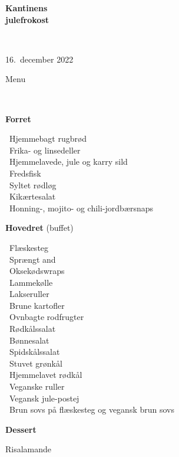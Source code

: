 \begin{center}
\begin{HUGE}
\textbf{Kantinens \\[3mm] julefrokost}
\end{HUGE}
\\[.6cm]
\begin{Large}
16.~december 2022
\end{Large}
\end{center}
\vspace*{.01cm}
\begin{center}
\begin{huge}
Menu
\end{huge}
\\[.1cm]
\end{center}
\newcommand{\course}[1]{\vspace*{4mm} \textbf{#1} \vspace{-7mm}}
\newcommand{\goodindent}{\null\hspace{23mm}}
{\small
\vspace{-0.5cm}
\begin{center}
\course{Forret}
\end{center}
  \goodindent~Hjemmebagt rugbrød
\\\goodindent~Frika- og linsedeller
\\\goodindent~Hjemmelavede, jule og karry sild
\\\goodindent~Fredsfisk
\\\goodindent~Syltet rødløg
\\\goodindent~Kikærtesalat
\\\goodindent~Honning-, mojito- og chili-jordbærsnaps

\begin{center}
\vspace{-0.2cm}
\course{Hovedret} (buffet)
\end{center}
  \goodindent~Flæskesteg
\\\goodindent~Sprængt and
\\\goodindent~Oksekødswraps
\\\goodindent~Lammekølle
\\\goodindent~Lakseruller
\\\goodindent~Brune kartofler
\\\goodindent~Ovnbagte rodfrugter
\\\goodindent~Rødkålssalat
\\\goodindent~Bønnesalat
\\\goodindent~Spidskålssalat
\\\goodindent~Stuvet grønkål
\\\goodindent~Hjemmelavet rødkål
\\\goodindent~Veganske ruller
\\\goodindent~Vegansk jule-postej
\\\goodindent~Brun sovs på flæskesteg og vegansk brun sovs

\begin{center}
\vspace{-0.2cm}
\course{Dessert}
\end{center}
  \goodindent Risalamande
}
